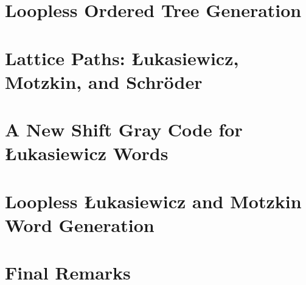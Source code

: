 \chapter{Loopless Ordered Tree Generation} \label{chap:otree-implementation}



\chapter{Lattice Paths: Łukasiewicz, Motzkin, and Schröder} \label{chap:luka-background}
 

\chapter{A New Shift Gray Code for Łukasiewicz Words} \label{chap:luka-graycode}

\chapter{Loopless Łukasiewicz and Motzkin Word Generation} \label{chap:luka-implementation}


\chapter{Final Remarks}






